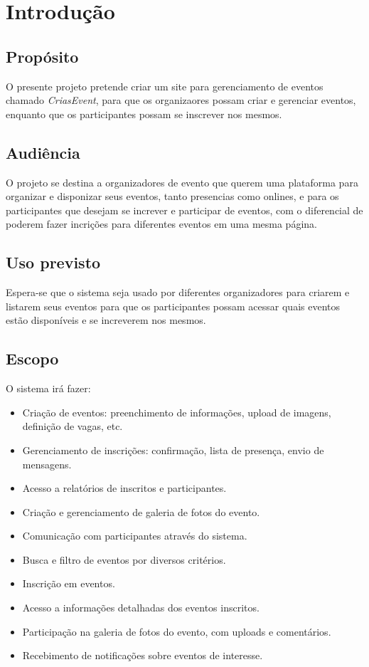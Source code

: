 \chapter{Introdução}
\label{ch:intro}
\section{Propósito}
    O presente projeto pretende criar um site para gerenciamento de eventos chamado \textit{CriasEvent}, para que os organizaores possam criar e gerenciar eventos, enquanto que os participantes possam se inscrever nos mesmos.
\section{Audiência}
    O projeto se destina a organizadores de evento que querem uma plataforma para organizar e disponizar seus eventos, tanto presencias como onlines, e para os participantes que desejam se increver e participar de eventos, com o diferencial de poderem fazer incrições para diferentes eventos em uma mesma página.
\section{Uso previsto}
    Espera-se que o sistema seja usado por diferentes organizadores para criarem e listarem seus eventos para que os participantes possam acessar quais eventos estão disponíveis e se increverem nos mesmos.
\section{Escopo}
    O sistema irá fazer:
    \begin{itemize}
        \item Criação de eventos: preenchimento de informações, upload de imagens, deﬁnição de vagas, etc.
        \item Gerenciamento de inscrições: conﬁrmação, lista de presença, envio de mensagens.
        \item Acesso a relatórios de inscritos e participantes.
        \item Criação e gerenciamento de galeria de fotos do evento.
        \item Comunicação com participantes através do sistema.
        \item Busca e ﬁltro de eventos por diversos critérios.
        \item Inscrição em eventos.
        \item Acesso a informações detalhadas dos eventos inscritos.
        \item Participação na galeria de fotos do evento, com uploads e comentários.
        \item Recebimento de notiﬁcações sobre eventos de interesse.
    \end{itemize}
